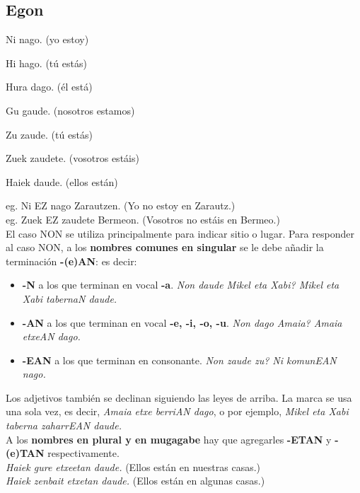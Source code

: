 \documentclass[11pt, a4paper]{article}
\begin{document}
\subsection{Egon}
\begin{itemize}
\begin{multicols}{2}
\item Ni nago. (yo estoy)
\item Hi hago. (tú estás)
\item Hura dago. (él está)\\
\item Gu gaude. (nosotros estamos)
\item Zu zaude. (tú estás)
\item Zuek zaudete. (vosotros estáis)
\item Haiek daude. (ellos están)
\end{multicols}
\end{itemize}
\indent \indent eg. Ni EZ nago Zarautzen. (Yo no estoy en Zarautz.)\\
\indent eg. Zuek EZ zaudete Bermeon. (Vosotros no estáis en Bermeo.)\\

\noindent El caso NON se utiliza principalmente para indicar sitio o lugar. Para responder al caso NON, a los \textbf{nombres comunes en singular} se le debe a\~nadir la terminaci\'on \textbf{-(e)AN}: es decir:
\begin{itemize}
\item \textbf{-N} a los que terminan en vocal \textbf{-a}.  \textit{Non daude Mikel eta Xabi? Mikel eta Xabi tabernaN daude.}
\item \textbf{-AN} a los que terminan en vocal \textbf{-e, -i, -o, -u}. \textit{Non dago Amaia? Amaia etxeAN dago.}
\item \textbf{-EAN} a los que terminan en consonante. \textit{Non zaude zu? Ni komunEAN nago.}
\end{itemize}

\noindent Los adjetivos también se declinan siguiendo las leyes de arriba. La marca se usa una sola vez, es decir, \textit{Amaia etxe berriAN dago}, o por ejemplo, \textit{Mikel eta Xabi taberna zaharrEAN daude.}\\

\noindent A los \textbf{nombres en plural y en mugagabe} hay que agregarles \textbf{-ETAN} y \textbf{-(e)TAN} respectivamente.\\
\indent \textit{Haiek gure etxeetan daude.} (Ellos están en nuestras casas.)\\
\indent \textit{Haiek zenbait etxetan daude.} (Ellos están en algunas casas.)\\
\end{document}
